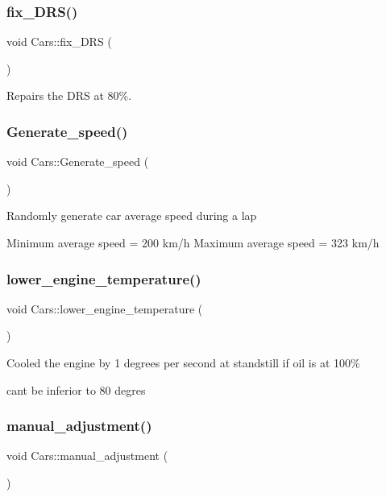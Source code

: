 \subsubsection{\texorpdfstring{fix\+\_\+\+D\+R\+S()}{fix\_DRS()}}
{\footnotesize\ttfamily void Cars\+::fix\+\_\+\+D\+RS (\begin{DoxyParamCaption}{ }\end{DoxyParamCaption})}

Repairs the D\+RS at 80\%. \mbox{\label{class_cars_aaa3b901d766d7ff61cbc2e051ca55128}} 
\subsubsection{\texorpdfstring{Generate\+\_\+speed()}{Generate\_speed()}}
{\footnotesize\ttfamily void Cars\+::\+Generate\+\_\+speed (\begin{DoxyParamCaption}{ }\end{DoxyParamCaption})}

Randomly generate car average speed during a lap

Minimum average speed = 200 km/h Maximum average speed = 323 km/h \mbox{\label{class_cars_a141616b56eb08bdb6d4d5b7d123ff86e}} 
\subsubsection{\texorpdfstring{lower\+\_\+engine\+\_\+temperature()}{lower\_engine\_temperature()}}
{\footnotesize\ttfamily void Cars\+::lower\+\_\+engine\+\_\+temperature (\begin{DoxyParamCaption}{ }\end{DoxyParamCaption})}

Cooled the engine by 1 degrees per second at standstill if oil is at 100\%

can\textquotesingle{}t be inferior to 80 degres \mbox{\label{class_cars_a87ccc17a207f38be7181636757e52e6c}} 
\subsubsection{\texorpdfstring{manual\+\_\+adjustment()}{manual\_adjustment()}}
{\footnotesize\ttfamily void Cars\+::manual\+\_\+adjustment (\begin{DoxyParamCaption}{ }\end{DoxyParamCaption})}

